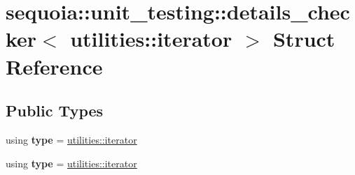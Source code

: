 \hypertarget{structsequoia_1_1unit__testing_1_1details__checker_3_01utilities_1_1iterator_01_4}{}\section{sequoia\+::unit\+\_\+testing\+::details\+\_\+checker$<$ utilities\+::iterator $>$ Struct Reference}
\label{structsequoia_1_1unit__testing_1_1details__checker_3_01utilities_1_1iterator_01_4}
\subsection*{Public Types}
\begin{DoxyCompactItemize}
\item 
\mbox{\label{structsequoia_1_1unit__testing_1_1details__checker_3_01utilities_1_1iterator_01_4_a1438c66d31a248504813e38f57106329}} 
using {\bfseries type} = \mbox{\hyperlink{classsequoia_1_1utilities_1_1iterator}{utilities\+::iterator}}
\item 
\mbox{\label{structsequoia_1_1unit__testing_1_1details__checker_3_01utilities_1_1iterator_01_4_a1438c66d31a248504813e38f57106329}} 
using {\bfseries type} = \mbox{\hyperlink{classsequoia_1_1utilities_1_1iterator}{utilities\+::iterator}}
\end{DoxyCompactItemize}
